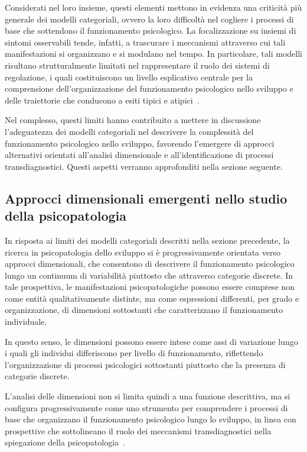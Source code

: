             Considerati nel loro insieme, questi elementi mettono in evidenza una criticità più generale dei modelli categoriali, ovvero la loro difficoltà nel cogliere i processi di base che sottendono il funzionamento psicologico. La focalizzazione su insiemi di sintomi osservabili tende, infatti, a trascurare i meccanismi attraverso cui tali manifestazioni si organizzano e si modulano nel tempo. In particolare, tali modelli risultano strutturalmente limitati nel rappresentare il ruolo dei sistemi di regolazione, i quali costituiscono un livello esplicativo centrale per la comprensione dell'organizzazione del funzionamento psicologico nello sviluppo e delle traiettorie che conducono a esiti tipici e atipici~\cite{beauchaine2019}.

            Nel complesso, questi limiti hanno contribuito a mettere in discussione l'adeguatezza dei modelli categoriali nel descrivere la complessità del funzionamento psicologico nello sviluppo, favorendo l'emergere di approcci alternativi orientati all'analisi dimensionale e all'identificazione di processi transdiagnostici. Questi aspetti verranno approfonditi nella sezione seguente.

        \subsection{Approcci dimensionali emergenti nello studio della psicopatologia}
        \label{sec:2_4_2}

            In risposta ai limiti dei modelli categoriali descritti nella sezione precedente, la ricerca in psicopatologia dello sviluppo si è progressivamente orientata verso approcci dimensionali, che consentono di descrivere il funzionamento psicologico lungo un continuum di variabilità piuttosto che attraverso categorie discrete. In tale prospettiva, le manifestazioni psicopatologiche possono essere comprese non come entità qualitativamente distinte, ma come espressioni differenti, per grado e organizzazione, di dimensioni sottostanti che caratterizzano il funzionamento individuale.

            In questo senso, le dimensioni possono essere intese come assi di variazione lungo i quali gli individui differiscono per livello di funzionamento, riflettendo l'organizzazione di processi psicologici sottostanti piuttosto che la presenza di categorie discrete.

            L'analisi delle dimensioni non si limita quindi a una funzione descrittiva, ma si configura progressivamente come uno strumento per comprendere i processi di base che organizzano il funzionamento psicologico lungo lo sviluppo, in linea con prospettive che sottolineano il ruolo dei meccanismi transdiagnostici nella spiegazione della psicopatologia~\cite{nolenhoeksema2011}.

